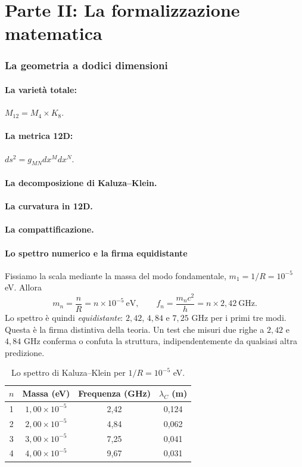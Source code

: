 \part*{Parte II: La formalizzazione matematica}

\section{La geometria a dodici dimensioni}
\subsection{La varietà totale:} $M_{12} = M_4 \times K_8$.
\subsection{La metrica 12D:} $ds^2 = g_{MN} dx^M dx^N$.
\subsection{La decomposizione di Kaluza--Klein.}
\subsection{La curvatura in 12D.}
\subsection{La compattificazione.}

\subsection{Lo spettro numerico e la firma equidistante}
Fissiamo la scala mediante la massa del modo fondamentale, $m_1 = 1/R = 10^{-5}$ eV. Allora
\begin{equation}
m_n = \frac{n}{R} = n \times 10^{-5}\ \text{eV},
\qquad
f_n = \frac{m_n c^2}{h} = n \times 2,42\ \text{GHz}.
\end{equation}
Lo spettro è quindi \emph{equidistante}: $2,42$, $4,84$ e $7,25$ GHz per i primi tre modi. Questa è la firma distintiva della teoria. Un test che misuri due righe a $2,42$ e $4,84$ GHz conferma o confuta la struttura, indipendentemente da qualsiasi altra predizione.

\begin{table}[H]
\centering
\begin{tabular}{@{}cccc@{}}
\toprule
$n$ & Massa (eV) & Frequenza (GHz) & $\lambda_C$ (m) \\ \midrule
1 & $1,00\times10^{-5}$ & 2,42 & 0,124 \\
2 & $2,00\times10^{-5}$ & 4,84 & 0,062 \\
3 & $3,00\times10^{-5}$ & 7,25 & 0,041 \\
4 & $4,00\times10^{-5}$ & 9,67 & 0,031 \\ \bottomrule
\end{tabular}
\caption{Lo spettro di Kaluza--Klein per $1/R = 10^{-5}$ eV.}
\label{tab:spectru}
\end{table}


